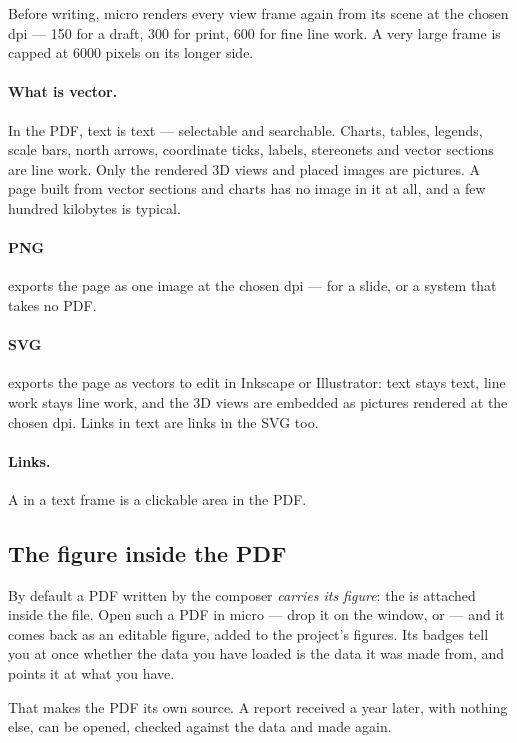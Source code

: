 Before writing, micro renders every view frame again from its scene at the chosen dpi — 150 for a draft, 300 for print, 600 for fine line work. A very large frame is capped at 6000 pixels on its longer side.

\paragraph{What is vector.} In the PDF, text is text — selectable and searchable. Charts, tables, legends, scale bars, north arrows, coordinate ticks, labels, stereonets and vector sections are line work. Only the rendered 3D views and placed images are pictures. A page built from vector sections and charts has no image in it at all, and a few hundred kilobytes is typical.

\paragraph{PNG} exports the page as one image at the chosen dpi — for a slide, or a system that takes no PDF.

\paragraph{SVG} exports the page as vectors to edit in Inkscape or Illustrator: text stays text, line work stays line work, and the 3D views are embedded as pictures rendered at the chosen dpi. Links in text are links in the SVG too.

\paragraph{Links.} A  in a text frame is a clickable area in the PDF.

\subsection{The figure inside the PDF}

By default a PDF written by the composer \emph{carries its figure}: the  is attached inside the file. Open such a PDF in micro — drop it on the window, or  — and it comes back as an editable figure, added to the project's figures. Its badges tell you at once whether the data you have loaded is the data it was made from, and  points it at what you have.

That makes the PDF its own source. A report received a year later, with nothing else, can be opened, checked against the data and made again.

